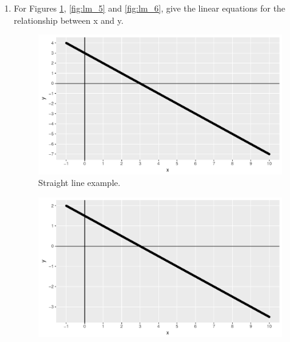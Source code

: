 \documentclass[]{report}\usepackage[]{graphicx}\usepackage[]{color}
\makeatletter
\def\maxwidth{ %
  \ifdim\Gin@nat@width>\linewidth
    \linewidth
  \else
    \Gin@nat@width
  \fi
}
\newenvironment{knitrout}{}{} %
\makeatother
\begin{document}
\begin{enumerate}
\item
For Figures \ref{fig:lm_4}, \ref{fig:lm_5} and \ref{fig:lm_6}, give the linear equations for the relationship between x and y.


\begin{knitrout}
\color{fgcolor}\begin{figure}

{\centering \includegraphics[width=\maxwidth]{figure/lm_4-1} 

}

\caption[Straight line example]{Straight line example.}\label{fig:lm_4}
\end{figure}


\end{knitrout}

\begin{knitrout}
\color{fgcolor}\begin{figure}

{\centering \includegraphics[width=\maxwidth]{figure/lm_5-1} 

}
\end{figure}
\end{knitrout}
\end{enumerate}
\end{document}
